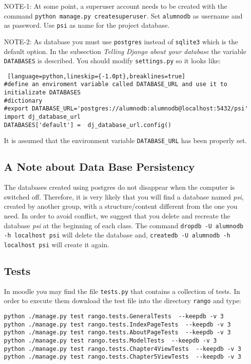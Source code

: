 \documentclass[12pt]{article} %
\begin{document}
NOTE-1: At some point, a superuser account needs to be created with the command \texttt{python manage.py createsuperuser}. Set \texttt{alumnodb} as username and as password. Use \texttt{psi} as name for the project database. 

NOTE-2: As database you must use \texttt{postgres} instead of \texttt{sqlite3} which is the default option. In the subsection \textit{Telling Django about your database} the variable  \texttt{DATABASES} is described. You should modify \texttt{settings.py} so it looks like:\\
\begin{lstlisting} [language=python,lineskip={-1.0pt},breaklines=true] 
#define an enviroment variable called DATABASE_URL and use it to initializate DATABASES
#dictionary
#export DATABASE_URL='postgres://alumnodb:alumnodb@localhost:5432/psi'
import dj_database_url
DATABASES['default'] =  dj_database_url.config()   
\end{lstlisting}
It is assumed that the environment variable  \texttt{DATABASE\_URL} has been properly set.

\subsection{A Note about Data Base Persistency}
The databases created using postgres do not disappear when the computer is switched off. Therefore, it is very likely that you will find a database named \textit{psi}, created by another group, with a structure/content different from the one you need. In order to avoid conflict, we suggest that you delete and recreate the database \textit{psi} at the beginning of each class. The command  \texttt{dropdb -U alumnodb -h localhost psi} will delete the database and,  \texttt{createdb -U alumnodb -h localhost psi}  will create it again.

\subsection{Tests}
In moodle you may find the file \texttt{tests.py} that contains a collection of tests. In order to execute them  download the test file into the directory \texttt{rango} and type:
\begin{verbatim}
python ./manage.py test rango.tests.GeneralTests  --keepdb -v 3
python ./manage.py test rango.tests.IndexPageTests  --keepdb -v 3
python ./manage.py test rango.tests.AboutPageTests  --keepdb -v 3
python ./manage.py test rango.tests.ModelTests  --keepdb -v 3
python ./manage.py test rango.tests.Chapter4ViewTests  --keepdb -v 3
python ./manage.py test rango.tests.Chapter5ViewTests  --keepdb -v 3
\end{verbatim}
\end{document}
